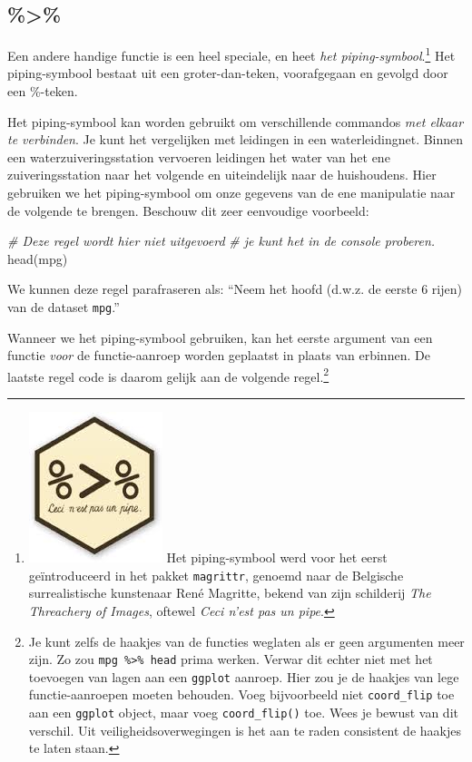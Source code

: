 \documentclass[]{tufte-book}
\newenvironment{Shaded}{}{}
\newcommand{\CommentTok}[1]{\textcolor[rgb]{0.38,0.63,0.69}{\textit{#1}}}
\newcommand{\FunctionTok}[1]{\textcolor[rgb]{0.02,0.16,0.49}{#1}}
\newcommand{\NormalTok}[1]{#1}
\begin{document}
\hypertarget{section}{%
\subsection{\%\textgreater\%}\label{section}}

Een andere handige functie is een heel speciale, en heet \emph{het piping-symbool}.\footnote{\includegraphics{images/pipe.jpg} Het piping-symbool werd voor het eerst geïntroduceerd in het pakket \texttt{magrittr}, genoemd naar de Belgische surrealistische kunstenaar René Magritte, bekend van zijn schilderij \emph{The Threachery of Images}, oftewel \emph{Ceci n'est pas un pipe}.} Het piping-symbool bestaat uit een groter-dan-teken, voorafgegaan en gevolgd door een \%-teken.

Het piping-symbool kan worden gebruikt om verschillende commandos \emph{met elkaar te verbinden}. Je kunt het vergelijken met leidingen in een waterleidingnet. Binnen een waterzuiveringsstation vervoeren leidingen het water van het ene zuiveringsstation naar het volgende en uiteindelijk naar de huishoudens. Hier gebruiken we het piping-symbool om onze gegevens van de ene manipulatie naar de volgende te brengen. Beschouw dit zeer eenvoudige voorbeeld:

\begin{Shaded}
\begin{Highlighting}[]
\CommentTok{\# Deze regel wordt hier niet uitgevoerd}
\CommentTok{\# je kunt het in de console proberen.}
\FunctionTok{head}\NormalTok{(mpg)}
\end{Highlighting}
\end{Shaded}

We kunnen deze regel parafraseren als: ``Neem het hoofd (d.w.z. de eerste 6 rijen) van de dataset \texttt{mpg}.''

Wanneer we het piping-symbool gebruiken, kan het eerste argument van een functie \emph{voor} de functie-aanroep worden geplaatst in plaats van erbinnen. De laatste regel code is daarom gelijk aan de volgende regel.\footnote{Je kunt zelfs de haakjes van de functies weglaten als er geen argumenten meer zijn. Zo zou \texttt{mpg\ \%\textgreater{}\%\ head} prima werken. Verwar dit echter niet met het toevoegen van lagen aan een \texttt{ggplot} aanroep. Hier zou je de haakjes van lege functie-aanroepen moeten behouden. Voeg bijvoorbeeld niet \texttt{coord\_flip} toe aan een \texttt{ggplot} object, maar voeg \texttt{coord\_flip()} toe. Wees je bewust van dit verschil. Uit veiligheidsoverwegingen is het aan te raden consistent de haakjes te laten staan.}
\end{document}
